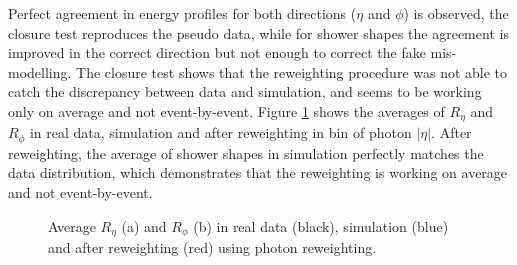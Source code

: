 Perfect agreement in energy profiles for both directions ($\eta$ and $\phi$) is observed, the closure test reproduces the pseudo data, while for shower shapes the agreement is improved in the correct direction but not enough to correct the fake mis-modelling. The closure test shows that the reweighting procedure was not able to catch the discrepancy between data and simulation, and seems to be working only on average and not event-by-event. Figure \ref{fig:gamma:ss:reweighting:photon:closure:avg} shows the averages of $R_{\eta}$ and $R_{\phi}$ in real data, simulation and after reweighting in bin of photon $|\eta|$. After reweighting, the average of shower shapes in simulation perfectly matches the data distribution, which demonstrates that the reweighting is working on average and not event-by-event.

\begin{figure}[htbp]
    \centering
    \caption{Average $R_{\eta}$ (a) and $R_{\phi}$ (b) in real data (black), simulation (blue) and after reweighting (red) using photon reweighting.}
    \label{fig:gamma:ss:reweighting:photon:closure:avg}
\end{figure}

\label{tab:avg}

